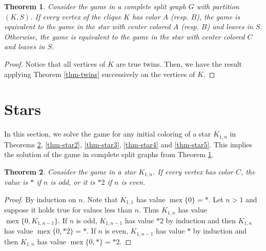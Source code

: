 \documentclass[a4paper,11pt]{article}
\newtheorem{theorem}{Theorem}
\DeclareMathOperator{\mex}{mex}
\begin{document}
\begin{theorem}\label{thm-split}
Consider the game in a complete split graph $G$ with partition $(K,S)$. If every vertex of the clique $K$ has color $A$ (resp. $B$), the game is equivalent to the game in the star with center colored $A$ (resp. $B$) and leaves in $S$. Otherwise, the game is equivalent to the game in the star  with center colored $C$ and leaves in $S$.
\end{theorem}

\begin{proof}
Notice that all vertices of $K$ are true twins. Then, we have the result applying Theorem \ref{thm-twins} successively on the vertices of $K$.
\end{proof}


\section{Stars}\label{sec-star}

In this section, we solve the game for any initial coloring of a star $K_{1,n}$ in Theorems \ref{thm-star1}, \ref{thm-star2}, \ref{thm-star3}, \ref{thm-star4} and \ref{thm-star5}. This implies the solution of the game in complete split graphs from Theorem \ref{thm-split}.

\begin{theorem}\label{thm-star1}
Consider the game in a star $K_{1,n}$.
If every vertex has color $C$, the value is $*$ if $n$ is odd, or it is $*2$ if $n$ is even.
\end{theorem}

\begin{proof}
By induction on $n$.
Note that $K_{1,1}$ has value $\mex\{0\}=*$.
Let $n>1$ and suppose it holds true for values less than $n$.
Thus $K_{1,n}$ has value $\mex\{0,K_{1,n-1}\}$. If $n$ is odd, $K_{1,n-1}$ has value $*2$ by induction and then $K_{1,n}$ has value $\mex\{0,*2\}=*$. If $n$ is even, $K_{1,n-1}$ has value $*$ by induction and then $K_{1,n}$ has value $\mex\{0,*\}=*2$. 
\end{proof}
\end{document}
